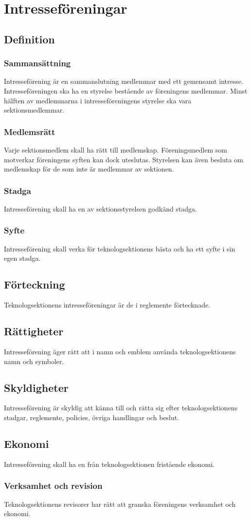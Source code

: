 \section{Intresseföreningar}

\subsection{Definition}

\subsubsection{Sammansättning}
Intresseförening är en sammanslutning medlemmar med ett gemensamt intresse. Intresseföreningen ska ha en styrelse bestående av föreningens medlemmar. Minst hälften av medlemmarna i intresseföreningens styrelse ska vara sektionsmedlemmar.

\subsubsection{Medlemsrätt}
Varje sektionsmedlem skall ha rätt till medlemskap. Föreningsmedlem som motverkar föreningens syften kan dock uteslutas. Styrelsen kan även besluta om medlemskap för de som inte är medlemmar av sektionen.

\subsubsection{Stadga}
Intresseförening skall ha en av sektionsstyrelsen godkänd stadga.

\subsubsection{Syfte}
Intresseförening skall verka för teknologsektionens bästa och ha ett syfte i sin egen stadga.

\subsection{Förteckning}
Teknologsektionens intresseföreningar är de i reglemente förtecknade.

\subsection{Rättigheter}
Intresseförening äger rätt att i namn och emblem använda teknologsektionens namn och symboler.

\subsection{Skyldigheter}
Intresseförening är skyldig att känna till och rätta sig efter teknologsektionens stadgar, reglemente, policies, övriga handlingar och beslut.

\subsection{Ekonomi}
Intresseförening skall ha en från teknologsektionen fristående ekonomi.

\subsubsection{Verksamhet och revision}
Teknologsektionens revisorer har rätt att granska föreningens verksamhet och ekonomi.